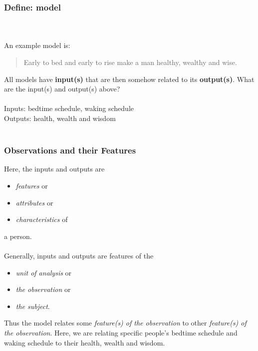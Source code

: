 \documentclass[slides]{beamer} %
\begin{document}
\begin{frame}\frametitle{Define: model}

  \pause \\~\\ An example model is:

\begin{quotation}
Early to bed and early to rise make a man healthy, wealthy and wise.
\end{quotation}

All models have \textbf{input(s)} that are then somehow related to its \textbf{output(s)}. What are the input(s) and output(s) above? \\~\\

Inputs: \pause bedtime schedule, waking schedule \\
Outputs: \pause health, wealth and wisdom \\~\\

\end{frame}


\begin{frame}\frametitle{Observations and their Features}

\small
Here, the inputs and outputs are 

\begin{itemize}
\item \textit{features} or 
\item \textit{attributes} or 
\item \textit{characteristics} of
\end{itemize}

a person. \\~\\

Generally, inputs and outputs are features of the 

\begin{itemize}
\item \textit{unit of analysis} or 
\item \textit{the observation} or 
\item \textit{the subject}.
\end{itemize} 


Thus the model relates some \textit{feature(s) of the observation} to other \textit{feature(s) of the observation}. Here, we are relating specific people's bedtime schedule and waking schedule to their health, wealth and wisdom.
\end{frame}
\end{document}
